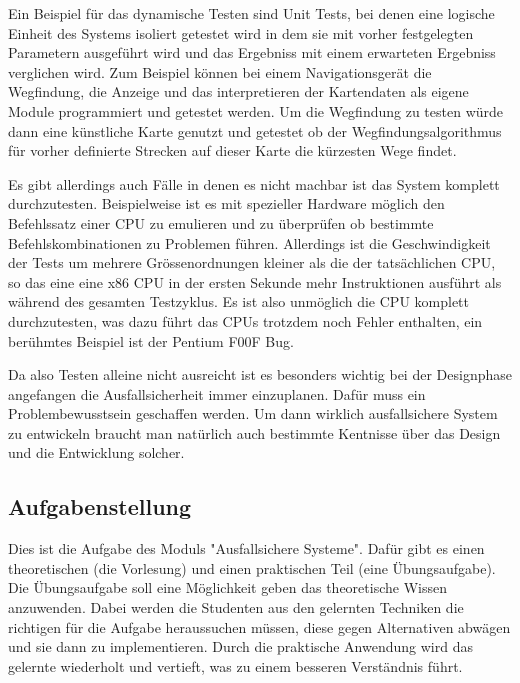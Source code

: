 Ein Beispiel f{\"{u}}r das dynamische Testen sind Unit Tests, bei denen eine logische Einheit des Systems isoliert getestet wird
in dem sie mit vorher festgelegten Parametern ausgef{\"{u}}hrt wird und das Ergebniss mit einem erwarteten Ergebniss verglichen
wird. Zum Beispiel k{\"{o}}nnen bei einem Navigationsger{\"{a}}t die Wegfindung, die Anzeige und das interpretieren der Kartendaten
als eigene Module programmiert und getestet werden. Um die Wegfindung zu testen w{\"{u}}rde dann eine k{\"{u}}nstliche Karte genutzt
und getestet ob der Wegfindungsalgorithmus f{\"{u}}r vorher definierte Strecken auf dieser Karte die k{\"{u}}rzesten Wege
findet.

Es gibt allerdings auch F{\"{a}}lle in denen es nicht machbar ist das System komplett durchzutesten. Beispielweise ist es
mit spezieller Hardware m{\"{o}}glich den Befehlssatz einer CPU zu emulieren und zu {\"{u}}berpr{\"{u}}fen ob bestimmte Befehlskombinationen
zu Problemen f{\"{u}}hren. Allerdings ist die Geschwindigkeit der Tests um mehrere Gr{\"{o}}ssenordnungen kleiner als die der tats{\"{a}}chlichen
CPU, so das eine eine x86 CPU in der ersten Sekunde mehr Instruktionen ausf{\"{u}}hrt als w{\"{a}}hrend des gesamten Testzyklus\cite{kaplan}.
Es ist also unm{\"{o}}glich die CPU komplett durchzutesten, was dazu f{\"{u}}hrt das CPUs trotzdem noch Fehler enthalten, ein ber{\"{u}}hmtes
Beispiel ist der Pentium F00F Bug.

Da also Testen alleine nicht ausreicht ist es besonders wichtig bei der Designphase angefangen die Ausfallsicherheit immer einzuplanen. Daf{\"{u}}r
muss ein Problembewusstsein geschaffen werden. Um dann wirklich ausfallsichere System zu entwickeln braucht man nat{\"{u}}rlich auch bestimmte Kentnisse 
{\"{u}}ber das Design und die Entwicklung solcher.

\subsection{Aufgabenstellung} Dies ist die Aufgabe des Moduls "Ausfallsichere Systeme". Daf{\"{u}}r gibt es einen theoretischen (die Vorlesung) und
einen praktischen Teil (eine {\"{U}}bungsaufgabe). Die {\"{U}}bungsaufgabe soll eine M{\"{o}}glichkeit geben das theoretische Wissen anzuwenden.
Dabei werden die Studenten aus den gelernten Techniken die richtigen f{\"{u}}r die Aufgabe heraussuchen m{\"{u}}ssen, diese gegen Alternativen
abw{\"{a}}gen und sie dann zu implementieren. Durch die praktische Anwendung wird das gelernte wiederholt und vertieft, was zu einem besseren
Verst{\"{a}}ndnis f{\"{u}}hrt.

